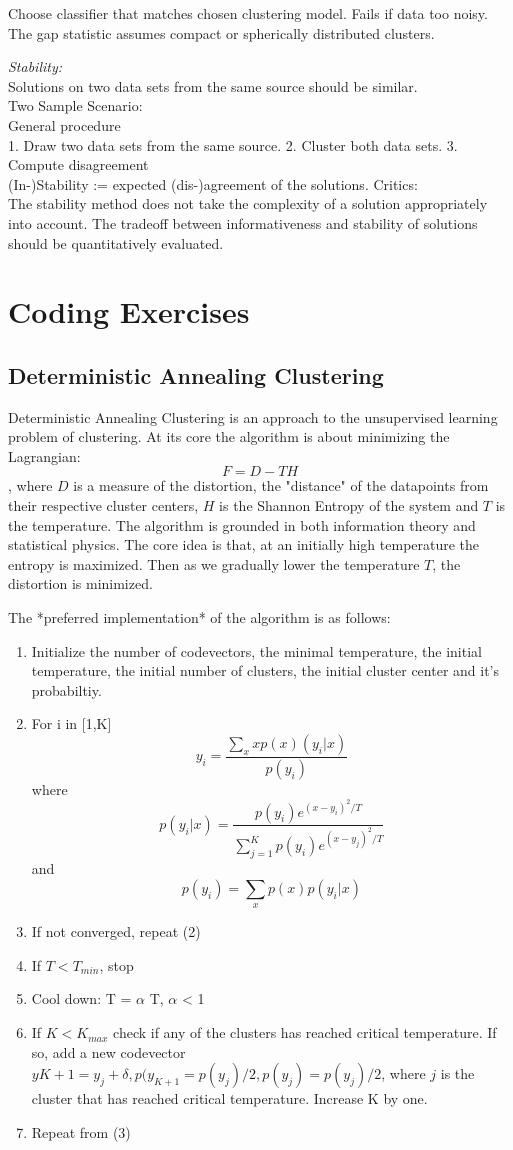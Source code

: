 \documentclass[9pt,parskip]{scrartcl}
\begin{document}
\begin{multicols*}{4}
Choose classifier that matches chosen clustering model. Fails if data too noisy. The gap statistic assumes
compact or spherically
distributed clusters.

\textit{Stability:}\\
Solutions on two data sets from the same
source should be similar. \\
Two Sample Scenario:\\
General procedure\\
1. Draw two data sets from the same source.
2. Cluster both data sets.
3. Compute disagreement\\
(In-)Stability := expected (dis-)agreement of the solutions.
Critics: \\
The stability method does not take the complexity of a solution
appropriately into account. The tradeoff between
informativeness and stability of solutions should be
quantitatively evaluated.

\section*{Coding Exercises}
\subsection*{Deterministic Annealing Clustering}
Deterministic Annealing Clustering is an approach to the unsupervised learning problem of clustering. At its core the algorithm is about minimizing the Lagrangian: $$F = D - TH$$
, where $D$ is a measure of the distortion, the "distance" of the datapoints from their respective cluster centers, $H$ is the Shannon Entropy of the system and $T$ is the temperature. The algorithm is grounded in both information theory and statistical physics. The core idea is that, at an initially high temperature the entropy is maximized. Then as we gradually lower the temperature $T$, the distortion is minimized. 

The *preferred implementation* of the algorithm is as follows:
\begin{enumerate}
    \item Initialize the number of codevectors, the minimal temperature, the initial temperature, the initial number of clusters, the initial cluster center and it's probabiltiy. 
\item For i in [1,K] $$y_i = \frac{\sum_x x p(x)(y_i|x)}{p(y_i)}$$ 
    where $$p(y_i|x) = \frac{p(y_i)e^{(x-y_i)^2/T}}{\sum_{j=1}^Kp(y_i)e^{(x-y_j)^2/T}}$$
    and $$p(y_i) = \sum_xp(x)p(y_i|x)$$
\item If not converged, repeat (2)
\item If $T < T_{min}$, stop
\item Cool down: T = $\alpha$ T, $\alpha$ < 1
\item If $K < K_{max}$ check if any of the clusters has reached critical temperature. If so, add a new codevector $y{K+1} = y_j + \delta, p(y_{K+1} = p(y_j)/2, p(y_j) = p(y_j)/2$, where $j$ is the cluster that has reached critical temperature. Increase K by one. 
\item Repeat from (3)
\end{enumerate}



\end{multicols*}
\end{document}
